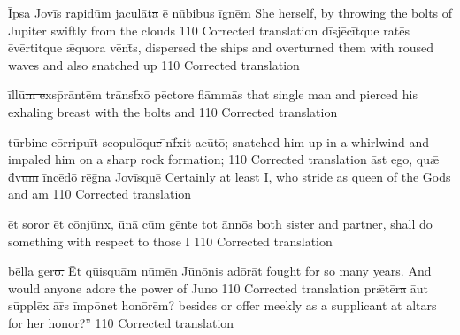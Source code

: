 \documentclass[]{article}
\begin{document}
\latline
  {\=Ips\-a J\-ov\=is r\-ap\-id\=um j\-ac\-ul\={\macron a}t\sout{a }\={\macron e} n\={\macron u}b\-ib\-us \=ign\=em}
  {She herself, by throwing the bolts of Jupiter swiftly from the clouds}
  {110} %
  {Corrected translation}
  {
  }
\newpage
\latline
  {d\=isj\={\macron e}c\=itqu\-e r\-at\={\macron e}s \={\macron e}v\=ert\-itqu\-e \={\ae}qu\-or\-a v\=ent\={\macron{\i}}s,}
  {dispersed the ships and overturned them with roused waves and also snatched up }
  {110} %
  {Corrected translation}
  {
  }

\latline
  {\=ill\=u\sout{m e}xsp\={\macron{\i}}r\=ant\=em tr\={\macron a}nsf\={\macron{\i}}x\={\macron o} p\=ect\-or\-e fl\=amm\={\macron a}s}
  {that single man and pierced his exhaling breast with the bolts and  }
  {110} %
  {Corrected translation}
  {
  }

\latline
  {t\=urb\-in\-e c\=orr\-ip\-u\=it sc\-op\-ul\={\macron o}qu\sout{e }\={\macron{\i}}nf\={\macron{\i}}x\-it \-ac\={\macron u}t\={\macron o};}
  {snatched him up in a whirlwind and impaled him on a sharp rock formation;}
  {110} %
  {Corrected translation}
  {
  }
\newpage
\latline
  {\=ast \-eg\-o, qu\={\ae} d\={\macron{\i}}v\sout{um }\=inc\={\macron e}d\={\macron o} r\={\macron e}g\={\macron{\i}}n\-a J\-ov\=isqu\=e}
  {Certainly at least I, who stride as queen of the Gods and am }
  {110} %
  {Corrected translation}
  {
  }

\latline
  {\=et s\-or\-or \=et c\=onj\={\macron u}nx, \={\macron u}n\={\macron a} c\=um g\=ent\-e t\-ot \=ann\={\macron o}s}
  {both sister and partner, shall do something with respect to those I }
  {110} %
  {Corrected translation}
  {
  }

\latline
  {b\=ell\-a g\-er\sout{o.  }\=Et q\={ui}squ\=am n\={\macron u}m\=en J\={\macron u}n\={\macron o}n\-is \-ad\={\macron o}r\=at}
  {fought for so many years.  And would anyone adore the power of Juno}
  {110} %
  {Corrected translation}
  {
  }
\newpage
\latline
  {pr\={\ae}t\=er\sout{\macron a }\={au}t s\=uppl\=ex \={\macron a}r\={\macron{\i}}s \=imp\={\macron o}n\-et h\-on\={\macron o}r\=em?}
  {besides or offer meekly as a supplicant at altars for her honor?''}
  {110} %
  {Corrected translation}
  {
  }
\end{document}
